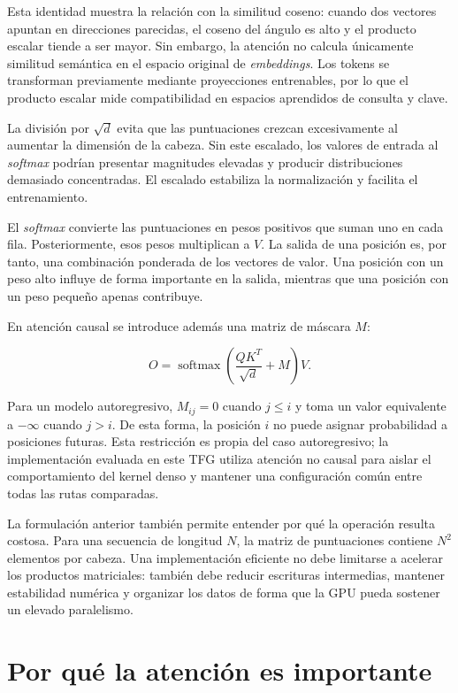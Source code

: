 Esta identidad muestra la relación con la similitud coseno: cuando dos vectores apuntan en direcciones parecidas, el coseno del ángulo es alto y el producto escalar tiende a ser mayor. Sin embargo, la atención no calcula únicamente similitud semántica en el espacio original de \textit{embeddings}. Los tokens se transforman previamente mediante proyecciones entrenables, por lo que el producto escalar mide compatibilidad en espacios aprendidos de consulta y clave.

La división por \(\sqrt{d}\) evita que las puntuaciones crezcan excesivamente al aumentar la dimensión de la cabeza. Sin este escalado, los valores de entrada al \textit{softmax} podrían presentar magnitudes elevadas y producir distribuciones demasiado concentradas. El escalado estabiliza la normalización y facilita el entrenamiento.

El \textit{softmax} convierte las puntuaciones en pesos positivos que suman uno en cada fila. Posteriormente, esos pesos multiplican a \(V\). La salida de una posición es, por tanto, una combinación ponderada de los vectores de valor. Una posición con un peso alto influye de forma importante en la salida, mientras que una posición con un peso pequeño apenas contribuye.

En atención causal se introduce además una matriz de máscara \(M\):

\begin{equation}
O = \operatorname{softmax}\left(\frac{QK^T}{\sqrt{d}} + M\right)V.
\end{equation}

Para un modelo autoregresivo, \(M_{ij}=0\) cuando \(j\leq i\) y toma un valor equivalente a \(-\infty\) cuando \(j>i\). De esta forma, la posición \(i\) no puede asignar probabilidad a posiciones futuras. Esta restricción es propia del caso autoregresivo; la implementación evaluada en este TFG utiliza atención no causal para aislar el comportamiento del kernel denso y mantener una configuración común entre todas las rutas comparadas.

La formulación anterior también permite entender por qué la operación resulta costosa. Para una secuencia de longitud \(N\), la matriz de puntuaciones contiene \(N^2\) elementos por cabeza. Una implementación eficiente no debe limitarse a acelerar los productos matriciales: también debe reducir escrituras intermedias, mantener estabilidad numérica y organizar los datos de forma que la GPU pueda sostener un elevado paralelismo.

\section{Por qué la atención es importante}

